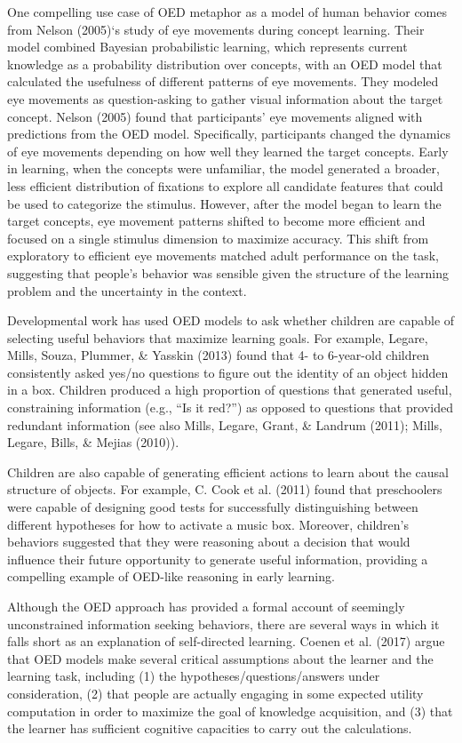 \documentclass[oneside]{report}
\begin{document}
One compelling use case of OED metaphor as a model of human behavior
comes from Nelson (2005)`s study of eye movements during concept
learning. Their model combined Bayesian probabilistic learning, which
represents current knowledge as a probability distribution over
concepts, with an OED model that calculated the usefulness of different
patterns of eye movements. They modeled eye movements as question-asking
to gather visual information about the target concept. Nelson (2005)
found that participants' eye movements aligned with predictions from the
OED model. Specifically, participants changed the dynamics of eye
movements depending on how well they learned the target concepts. Early
in learning, when the concepts were unfamiliar, the model generated a
broader, less efficient distribution of fixations to explore all
candidate features that could be used to categorize the stimulus.
However, after the model began to learn the target concepts, eye
movement patterns shifted to become more efficient and focused on a
single stimulus dimension to maximize accuracy. This shift from
exploratory to efficient eye movements matched adult performance on the
task, suggesting that people's behavior was sensible given the structure
of the learning problem and the uncertainty in the context.

Developmental work has used OED models to ask whether children are
capable of selecting useful behaviors that maximize learning goals. For
example, Legare, Mills, Souza, Plummer, \& Yasskin (2013) found that 4-
to 6-year-old children consistently asked yes/no questions to figure out
the identity of an object hidden in a box. Children produced a high
proportion of questions that generated useful, constraining information
(e.g., ``Is it red?'') as opposed to questions that provided redundant
information (see also Mills, Legare, Grant, \& Landrum (2011); Mills,
Legare, Bills, \& Mejias (2010)).

Children are also capable of generating efficient actions to learn about
the causal structure of objects. For example, C. Cook et al. (2011)
found that preschoolers were capable of designing good tests for
successfully distinguishing between different hypotheses for how to
activate a music box. Moreover, children's behaviors suggested that they
were reasoning about a decision that would influence their future
opportunity to generate useful information, providing a compelling
example of OED-like reasoning in early learning.

Although the OED approach has provided a formal account of seemingly
unconstrained information seeking behaviors, there are several ways in
which it falls short as an explanation of self-directed learning. Coenen
et al. (2017) argue that OED models make several critical assumptions
about the learner and the learning task, including (1) the
hypotheses/questions/answers under consideration, (2) that people are
actually engaging in some expected utility computation in order to
maximize the goal of knowledge acquisition, and (3) that the learner has
sufficient cognitive capacities to carry out the calculations.
\end{document}
